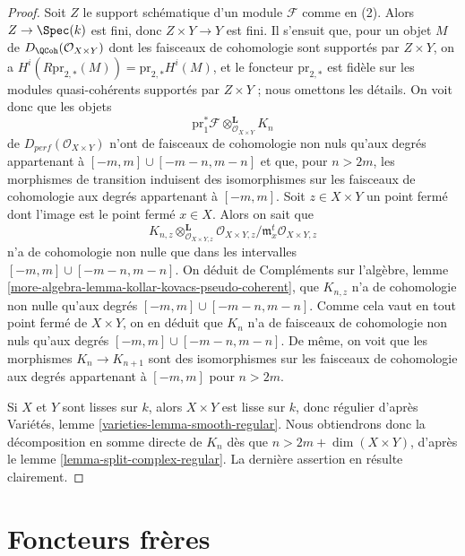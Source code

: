 \begin{proof}
Soit $Z$ le support schématique d'un module $\mathcal{F}$ comme en (2).
Alors $Z \to \Spec(k)$ est fini, donc $Z \times Y \to Y$ est fini.
Il s'ensuit que, pour un objet $M$ de $D_\QCoh(\mathcal{O}_{X \times Y})$
dont les faisceaux de cohomologie sont supportés par $Z \times Y$, on a
$H^i(R\text{pr}_{2, *}(M)) = \text{pr}_{2, *}H^i(M)$, et le foncteur
$\text{pr}_{2, *}$ est fidèle sur les modules quasi-cohérents supportés
par $Z \times Y$ ; nous omettons les détails. On voit donc que les objets
$$
\text{pr}_1^*\mathcal{F} \otimes_{\mathcal{O}_{X \times Y}}^\mathbf{L} K_n
$$
de $D_{perf}(\mathcal{O}_{X \times Y})$ n'ont de faisceaux de cohomologie non nuls
qu'aux degrés appartenant à $[-m, m] \cup [-m - n, m - n]$ et que, pour $n > 2m$, les morphismes de transition
induisent des isomorphismes sur les faisceaux de cohomologie aux degrés appartenant à $[-m, m]$.
Soit $z \in X \times Y$ un point fermé dont l'image est le point fermé
$x \in X$. Alors on sait que
$$
K_{n, z} \otimes_{\mathcal{O}_{X \times Y, z}}^\mathbf{L}
\mathcal{O}_{X \times Y, z}/\mathfrak m_x^t\mathcal{O}_{X \times Y, z}
$$
n'a de cohomologie non nulle que dans les intervalles
$[-m, m] \cup [-m - n, m - n]$.
On déduit de Compléments sur l'algèbre, lemme
\ref{more-algebra-lemma-kollar-kovacs-pseudo-coherent},
que $K_{n, z}$ n'a de cohomologie non nulle
qu'aux degrés $[-m, m] \cup [-m - n, m - n]$. Comme cela vaut en tout
point fermé de $X \times Y$, on en déduit que $K_n$ n'a de faisceaux de cohomologie non nuls
qu'aux degrés $[-m, m] \cup [-m - n, m - n]$.
De même, on voit que les morphismes $K_n \to K_{n + 1}$
sont des isomorphismes sur les faisceaux de cohomologie aux degrés appartenant à $[-m, m]$
pour $n > 2m$.

\medskip\noindent
Si $X$ et $Y$ sont lisses sur $k$, alors $X \times Y$ est lisse
sur $k$, donc régulier d'après
Variétés, lemme \ref{varieties-lemma-smooth-regular}.
Nous obtiendrons donc la décomposition en somme directe de $K_n$
dès que $n > 2m + \dim(X \times Y)$, d'après
le lemme \ref{lemma-split-complex-regular}. La dernière assertion
en résulte clairement.
\end{proof}





\section{Foncteurs frères}
\label{section-sibling}

